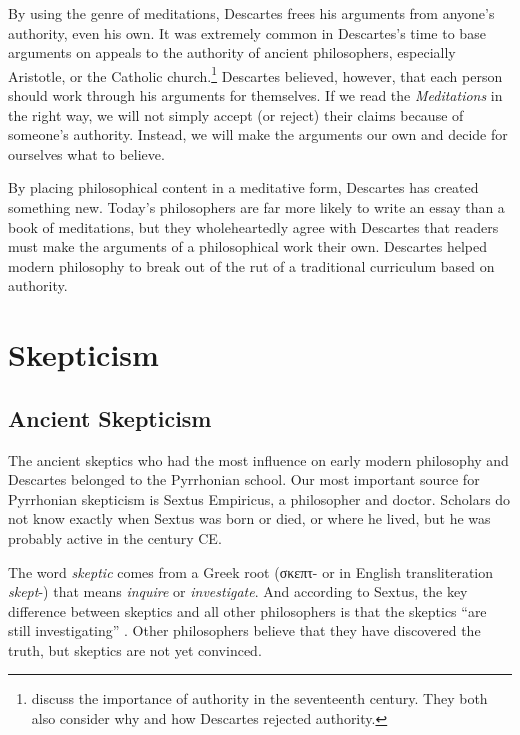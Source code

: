 By using the genre of meditations, Descartes frees his arguments from anyone's authority, even his own. It was extremely common in Descartes's time to base arguments on appeals to the authority of ancient philosophers, especially Aristotle, or the Catholic church.\footnote{\textcites[4--7]{cottingham1986}[4--5]{garber1998} discuss the importance of authority in the seventeenth century. They both also consider why and how Descartes rejected authority.} Descartes believed, however, that each person should work through his arguments for themselves. If we read the \textit{Meditations} in the right way, we will not simply accept (or reject) their claims because of someone's authority. Instead, we will make the arguments our own and decide for ourselves what to believe.

By placing philosophical content in a meditative form, Descartes has created something new. Today's philosophers are far more likely to write an essay than a book of meditations, but they wholeheartedly agree with Descartes that readers must make the arguments of a philosophical work their own. Descartes helped modern philosophy to break out of the rut of a traditional curriculum based on authority.

\section*{Skepticism}

\subsection*{Ancient Skepticism}

The ancient skeptics who had the most influence on early modern philosophy and Descartes belonged to the Pyrrhonian school. Our most important source for Pyrrhonian skepticism is Sextus Empiricus, a philosopher and doctor. Scholars do not know exactly when Sextus was born or died, or where he lived, but he was probably active in the  century CE.

The word \textit{skeptic} comes from a Greek root (\textgreek{σκεπτ}- or in English transliteration \textit{skept}-) that means \textit{inquire} or \textit{investigate}. And according to Sextus, the key difference between skeptics and all other philosophers is that the skeptics ``are still investigating'' \parencite[I 3]{annasbarnes1994}. Other philosophers believe that they have discovered the truth, but skeptics are not yet convinced.

